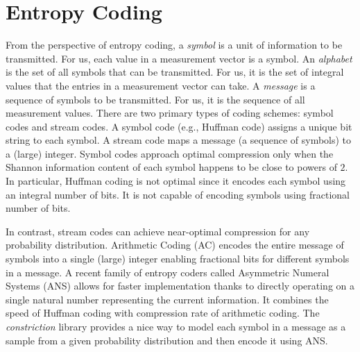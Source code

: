 \section{Entropy Coding}
\label{appsec:ec}
From the perspective of entropy coding, a \emph{symbol}
is a unit of information to be transmitted. For us,
each value in a measurement vector is a symbol.
An \emph{alphabet} is the set of all symbols that
can be transmitted. For us, it is the set of integral
values that the entries in a measurement vector can take.
A \emph{message} is a sequence of symbols to be transmitted.
For us, it is the sequence of all measurement values.
There are two primary types of coding schemes: symbol
codes and stream codes. A symbol code (e.g., Huffman code)
assigns a unique bit string to each symbol.
A stream code maps a message (a sequence of symbols)
to a (large) integer. Symbol codes approach optimal
compression only when the Shannon information content
of each symbol happens to be close to powers of $2$.
In particular, Huffman coding is not optimal
since it encodes each symbol using an integral
number of bits. It is not capable of encoding symbols using
fractional number of bits.

In contrast, stream codes can achieve near-optimal
compression for any probability distribution.
Arithmetic Coding (AC) \cite{rissanen1979arithmetic,witten1987arithmetic}
encodes the entire message of symbols into a single (large) integer
enabling fractional bits for different symbols in a message.
A recent family of entropy coders called Asymmetric Numeral Systems (ANS)
\cite{duda2013asymmetric}
allows for faster implementation
thanks to directly operating
on a single natural number representing the current information.
It combines the speed of Huffman coding with compression rate
of arithmetic coding.
The \emph{constriction} library \cite{bamler2022constriction} provides
a nice way to model each symbol in a message as a sample from
a given probability distribution and then encode it using ANS.


